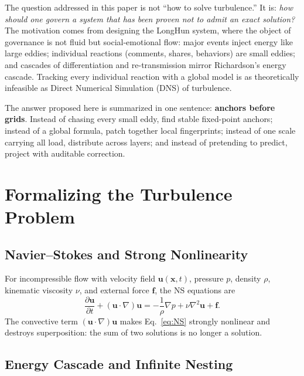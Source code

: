 \documentclass[10pt,a4paper]{article}
\theoremstyle{definition}
\begin{document}
The question addressed in this paper is not ``how to solve turbulence.'' It is: \emph{how should one govern a system that has been proven not to admit an exact solution?} The motivation comes from designing the LongHun system, where the object of governance is not fluid but social-emotional flow: major events inject energy like large eddies; individual reactions (comments, shares, behaviors) are small eddies; and cascades of differentiation and re-transmission mirror Richardson's energy cascade\cite{Richardson1922}. Tracking every individual reaction with a global model is as theoretically infeasible as Direct Numerical Simulation (DNS) of turbulence.

The answer proposed here is summarized in one sentence: \textbf{anchors before grids}. Instead of chasing every small eddy, find stable fixed-point anchors; instead of a global formula, patch together local fingerprints; instead of one scale carrying all load, distribute across layers; and instead of pretending to predict, project with auditable correction.

\section{Formalizing the Turbulence Problem}\label{sec:formalization}

\subsection{Navier--Stokes and Strong Nonlinearity}

For incompressible flow with velocity field $\mathbf{u}(\mathbf{x},t)$, pressure $p$, density $\rho$, kinematic viscosity $\nu$, and external force $\mathbf{f}$, the NS equations are
\begin{equation}
\frac{\partial \mathbf{u}}{\partial t} + (\mathbf{u}\cdot\nabla)\mathbf{u}
= -\frac{1}{\rho}\nabla p + \nu\nabla^2\mathbf{u} + \mathbf{f}.\label{eq:NS}
\end{equation}
The convective term $(\mathbf{u}\cdot\nabla)\mathbf{u}$ makes Eq.~\eqref{eq:NS} strongly nonlinear and destroys superposition: the sum of two solutions is no longer a solution.

\subsection{Energy Cascade and Infinite Nesting}
\end{document}
